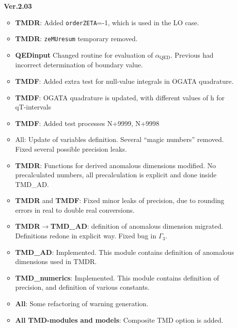\documentclass[prd,nofootinbib,eqsecnum,final]{revtex4}
\renewcommand{\(}{\left(}
\renewcommand{\)}{\right)}
\renewcommand{\[}{\left[}
\renewcommand{\]}{\right]}
\newcommand{\red}[1]{{\color[rgb]{1,0,0} #1}}
\begin{document}
\begin{itemize}
\item[\textbf{Ver.2.03}]
\begin{itemize}	
	\item \textbf{TMDR}: Added \texttt{orderZETA}=-1, which is used in the LO case.
 	\item \textbf{TMDR}: \texttt{zeMUresum} temporary removed.
	\item \textbf{QEDinput} \red{Changed routine for evaluation of $\alpha_{\text{QED}}$. Previous had incorrect determination of boundary value.}
	\item \textbf{TMDF}: Added extra test for null-value integrals in OGATA quadrature.
	\item \textbf{TMDF}: OGATA quadrature is updated, with different values of h for qT-intervals
	\item \textbf{TMDF}: Added test processes N+9999, N+9998
	\item {All}: Update of variables definition. Several ``magic numbers'' removed. Fixed several possible precision leaks.
	\item \textbf{TMDR}: Functions for derived anomalous dimensions modified. No precalculated numbers, all precalculation is explicit and done inside TMD\_AD.
	\item \textbf{TMDR} and \textbf{TMDF}: Fixed minor leaks of precision, due to rounding errors in real to double real conversions.
	\item \textbf{TMDR}$\to$\textbf{TMD\_AD}: definition of anomalous dimension migrated. Definitions redone in explicit way. Fixed bug in $\Gamma_3$.
	\item \textbf{TMD\_AD}: Implemented. This module contains definition of anomalous dimensions used in TMDR.
	\item \textbf{TMD\_numerics}: Implemented. This module contains definition of precision, and definition of various constants.
	\item \textbf{All}: Some refactoring of warning generation.
	\item \textbf{All TMD-modules and models}: Composite TMD option is added.
\end{itemize}


\end{itemize}
\end{document}
